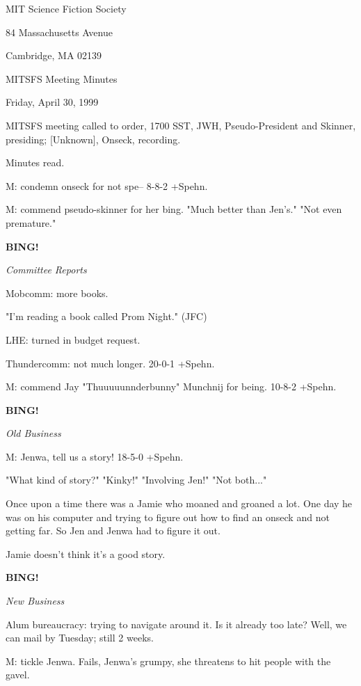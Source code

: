 \documentclass[12pt]{article}
\newcommand{\bing}{{\bf BING!} }
\newcommand{\goto}[1]{\bing \vskip 12pt \centerline{{\em{#1}}}}
\begin{document}
\begin{center}

MIT Science Fiction Society 

84 Massachusetts Avenue

Cambridge, MA 02139

\vspace{12pt}

MITSFS Meeting Minutes 

Friday, April 30, 1999

\end{center}
 
\vspace{18pt}

\setlength{\parskip}{6pt}

\noindent
MITSFS meeting called to order, 1700 SST,
JWH, Pseudo-President and Skinner, presiding; [Unknown], Onseck, recording.

Minutes read.

M: condemn onseck for not spe-- 8-8-2 +Spehn.

M: commend pseudo-skinner for her bing. "Much better than Jen's." "Not even premature."

\goto{Committee Reports}

Mobcomm: more books.

"I'm reading a book called Prom Night." (JFC)

LHE: turned in budget request.

Thundercomm: not much longer. 20-0-1 +Spehn.

M: commend Jay "Thuuuuunnderbunny" Munchnij for being. 10-8-2 +Spehn.

\goto{Old Business}

M: Jenwa, tell us a story! 18-5-0 +Spehn.

"What kind of story?" "Kinky!" "Involving Jen!" "Not both..."

Once upon a time there was a Jamie who moaned and groaned a lot. One day he was on his computer and trying to figure out how to find an onseck and not getting far. So Jen and Jenwa had to figure it out.

Jamie doesn't think it's a good story.

\goto{New Business}

Alum bureaucracy: trying to navigate around it.
Is it already too late? Well, we can mail by Tuesday; still 2 weeks.

M: tickle Jenwa. Fails, Jenwa's grumpy, she threatens to hit people with the gavel.
\end{document}
